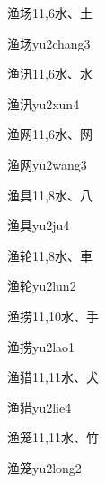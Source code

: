 \begin{entry}{渔场}{11,6}{⽔、⼟}
  \begin{phonetics}{渔场}{yu2chang3}
  \end{phonetics}
\end{entry}

\begin{entry}{渔汛}{11,6}{⽔、⽔}
  \begin{phonetics}{渔汛}{yu2xun4}
  \end{phonetics}
\end{entry}

\begin{entry}{渔网}{11,6}{⽔、⽹}
  \begin{phonetics}{渔网}{yu2wang3}
  \end{phonetics}
\end{entry}

\begin{entry}{渔具}{11,8}{⽔、⼋}
  \begin{phonetics}{渔具}{yu2ju4}
  \end{phonetics}
\end{entry}

\begin{entry}{渔轮}{11,8}{⽔、⾞}
  \begin{phonetics}{渔轮}{yu2lun2}
  \end{phonetics}
\end{entry}

\begin{entry}{渔捞}{11,10}{⽔、⼿}
  \begin{phonetics}{渔捞}{yu2lao1}
  \end{phonetics}
\end{entry}

\begin{entry}{渔猎}{11,11}{⽔、⽝}
  \begin{phonetics}{渔猎}{yu2lie4}
  \end{phonetics}
\end{entry}

\begin{entry}{渔笼}{11,11}{⽔、⽵}
  \begin{phonetics}{渔笼}{yu2long2}
  \end{phonetics}
\end{entry}

